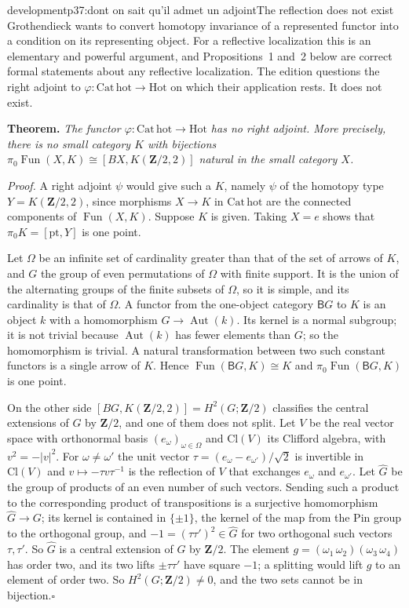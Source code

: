 \begin{dcomment}{development}{p37:dont on sait qu'il admet un adjoint}{The reflection does not exist}
Grothendieck wants to convert homotopy invariance of a represented functor into a condition on its representing object. For a reflective localization this is an elementary and powerful argument, and Propositions~1 and~2 below are correct formal statements about any reflective localization. The edition questions the right adjoint to $\varphi:\mathrm{Cat}\,\mathrm{hot}\to\mathrm{Hot}$ on which their application rests. It does not exist.

\textbf{Theorem.}\ours
\textit{The functor $\varphi:\mathrm{Cat}\,\mathrm{hot}\to\mathrm{Hot}$ has no right adjoint. More precisely, there is no small category $K$ with bijections $\pi_0\operatorname{Fun}(X,K)\cong[BX,K(\mathbf Z/2,2)]$ natural in the small category $X$.}

\textit{Proof.}
A right adjoint $\psi$ would give such a $K$, namely $\psi$ of the homotopy type $Y=K(\mathbf Z/2,2)$, since morphisms $X\to K$ in $\mathrm{Cat}\,\mathrm{hot}$ are the connected components of $\operatorname{Fun}(X,K)$. Suppose $K$ is given. Taking $X=e$ shows that $\pi_0K=[\mathrm{pt},Y]$ is one point.

Let $\Omega$ be an infinite set of cardinality greater than that of the set of arrows of $K$, and $G$ the group of even permutations of $\Omega$ with finite support. It is the union of the alternating groups of the finite subsets of $\Omega$, so it is simple, and its cardinality is that of $\Omega$. A functor from the one-object category $\mathsf BG$ to $K$ is an object $k$ with a homomorphism $G\to\operatorname{Aut}(k)$. Its kernel is a normal subgroup; it is not trivial because $\operatorname{Aut}(k)$ has fewer elements than $G$; so the homomorphism is trivial. A natural transformation between two such constant functors is a single arrow of $K$. Hence $\operatorname{Fun}(\mathsf BG,K)\cong K$ and $\pi_0\operatorname{Fun}(\mathsf BG,K)$ is one point.

On the other side $[BG,K(\mathbf Z/2,2)]=H^2(G;\mathbf Z/2)$ classifies the central extensions of $G$ by $\mathbf Z/2$, and one of them does not split. Let $V$ be the real vector space with orthonormal basis $(e_\omega)_{\omega\in\Omega}$ and $\mathrm{Cl}(V)$ its Clifford algebra, with $v^2=-|v|^2$. For $\omega\neq\omega'$ the unit vector $\tau=(e_\omega-e_{\omega'})/\sqrt2$ is invertible in $\mathrm{Cl}(V)$ and $v\mapsto-\tau v\tau^{-1}$ is the reflection of $V$ that exchanges $e_\omega$ and $e_{\omega'}$. Let $\widehat G$ be the group of products of an even number of such vectors. Sending such a product to the corresponding product of transpositions is a surjective homomorphism $\widehat G\to G$; its kernel is contained in $\{\pm1\}$, the kernel of the map from the Pin group to the orthogonal group, and $-1=(\tau\tau')^2\in\widehat G$ for two orthogonal such vectors $\tau,\tau'$. So $\widehat G$ is a central extension of $G$ by $\mathbf Z/2$. The element $g=(\omega_1\,\omega_2)(\omega_3\,\omega_4)$ has order two, and its two lifts $\pm\tau\tau'$ have square $-1$; a splitting would lift $g$ to an element of order two. So $H^2(G;\mathbf Z/2)\neq0$, and the two sets cannot be in bijection.\hfill$\square$


\end{dcomment}
